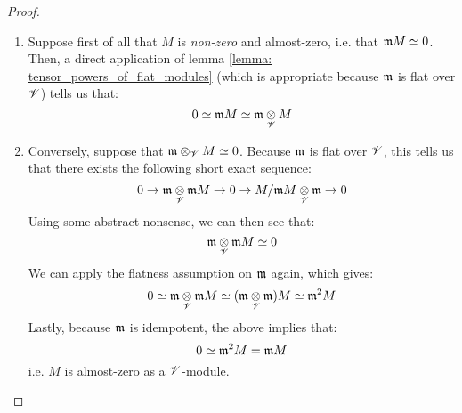                         \begin{proof}
                            \noindent
                            \begin{enumerate}
                                \item Suppose first of all that $M$ is \textit{non-zero} and almost-zero, i.e. that $\mathfrak{m} M \simeq 0$. Then, a direct application of lemma \ref{lemma: tensor_powers_of_flat_modules} (which is appropriate because $\mathfrak{m}$ is flat over $\mathscr{V}$) tells us that:
                                    $$0 \cong \m M \cong \m \tensor_{\scrV} M$$
                                \item Conversely, suppose that $\m \tensor_{\scrV} M \cong 0$. Because $\mathfrak{m}$ is flat over $\mathscr{V}$, this tells us that there exists the following short exact sequence:
                                    $$0 \to \m \tensor_{\scrV} \m M \to 0 \to M/\m M \tensor_{\scrV} \m \to 0$$
                                Using some abstract nonsense, we can then see that:
                                    $$\m \tensor_{\scrV} \m M \cong 0$$
                                We can apply the flatness assumption on $\mathfrak{m}$ again, which gives:
                                    $$0 \cong \m \tensor_{\scrV} \m M \cong (\m \tensor_{\scrV} \m) M \cong \m^2 M$$
                                Lastly, because $\mathfrak{m}$ is idempotent, the above implies that:
                                    $$0 \simeq \mathfrak{m}^2 M = \mathfrak{m} M$$
                                i.e. $M$ is almost-zero as a $\mathscr{V}$-module.
                            \end{enumerate}
                        \end{proof}
                        

